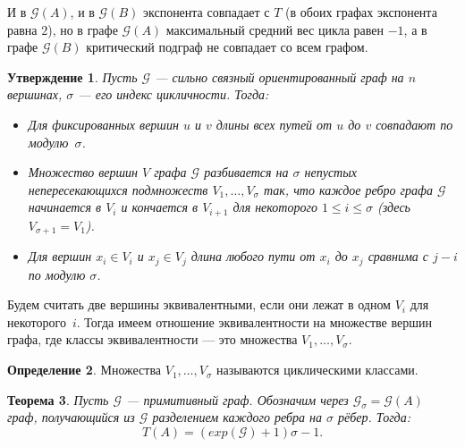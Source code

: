 \documentclass[12pt]{article}
\newtheorem{theorem}{Теорема}[section]
\newtheorem{proposition}[theorem]{Утверждение}
\theoremstyle{definition}
\newtheorem{definition}[theorem]{Определение}
\begin{document}
И в $\mathcal{G}(A)$, и в $\mathcal{G}(B)$ экспонента совпадает с $T$ (в обоих графах экспонента равна $2$), но в графе $\mathcal{G}(A)$ максимальный средний вес цикла равен $-1$, а в графе $\mathcal{G}(B)$ критический подграф не совпадает со всем графом.

\begin{proposition} \cite[лемма 3.4.1]{combinatorialMatrixTheory}
Пусть $\mathcal{G}$ --- сильно связный ориентированный граф на $n$ вершинах, $\sigma$ --- его индекс цикличности. Тогда:
\begin{itemize}
\item Для фиксированных вершин $u$ и $v$ длины всех путей от $u$ до $v$ совпадают по модулю~$\sigma$.
\item Множество вершин $V$ графа $\mathcal{G}$ разбивается на $\sigma$ непустых непересекающихся подмножеств $V_1, \dots, V_{\sigma}$ так, что каждое ребро графа $\mathcal{G}$ начинается в $V_i$ и кончается в $V_{i + 1}$ для некоторого $1 \le i \le \sigma$ (здесь $V_{\sigma + 1} = V_1$).
\item Для вершин $x_i \in V_i$ и $x_j \in V_j$ длина любого пути от $x_i$ до $x_j$ сравнима с $j - i$ по модулю $\sigma$.
\end{itemize}
\end{proposition}

Будем считать две вершины эквивалентными, если они лежат в одном $V_i$ для некоторого~$i$. Тогда имеем отношение эквивалентности на множестве вершин графа, где классы эквивалентности --- это множества $V_1, \dots, V_{\sigma}$.

\begin{definition}
Множества $V_1, \dots, V_{\sigma}$ называются циклическими классами.
\end{definition}

\begin{theorem}
\label{homothetyGraph}
Пусть $\mathcal{G}$ --- примитивный граф. Обозначим через $\mathcal{G}_{\sigma} = \mathcal{G}(A)$ граф, получающийся из $\mathcal{G}$ разделением каждого ребра на $\sigma$ рёбер. Тогда:
\begin{equation*}
T(A) = (exp(\mathcal{G}) + 1)\sigma - 1.
\end{equation*}
\end{theorem}
\end{document}
